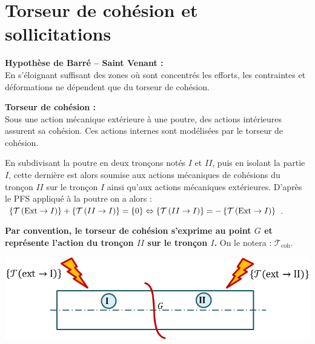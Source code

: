 \documentclass[10pt,fleqn]{article} %
\begin{document}
\section{Torseur de cohésion et sollicitations}

\begin{hypo}
\textbf{Hypothèse de Barré -- Saint Venant :}  ~\\
En s'éloignant suffisant des zones où sont concentrés les efforts, les contraintes et déformations ne dépendent que du torseur de cohésion. 
\end{hypo}


\begin{defi}
\textbf{Torseur de cohésion :} ~\\

Sous une action mécanique extérieure à une poutre, des actions intérieures assurent sa cohésion. Ces actions internes sont modélisées par le torseur de cohésion. 

En subdivisant la poutre en deux tronçons notés $I$ et $II$, puis en isolant la partie $I$, cette dernière est alors soumise aux actions mécaniques de cohésions du tronçon $II$ sur le tronçon $I$ ainsi qu'aux actions mécaniques extérieures. D'après le PFS appliqué à la poutre on a alors :
$\left\{\mathcal{T} \left(\text{Ext}\rightarrow I \right) \right\}+\left\{\mathcal{T} \left(II\rightarrow I \right) \right\} = \left\{0\right\} \Leftrightarrow 
\left\{\mathcal{T} \left(II\rightarrow I \right) \right\} = - \left\{\mathcal{T} \left(\text{Ext}\rightarrow I \right) \right\}$. 

\begin{minipage}[c]{.65\linewidth}

\textbf{Par convention, le torseur de cohésion s'exprime au point $G$ et représente l'action du tronçon $II$ sur le tronçon $I$.} On le notera : $\mathcal{T}_{\text{coh}}$.

\end{minipage} \hfill
\begin{minipage}[c]{.3\linewidth}
\begin{center}
\includegraphics[width=\linewidth]{images/cohesion}
\end{center}
\end{minipage}

\end{defi}
\end{document}

